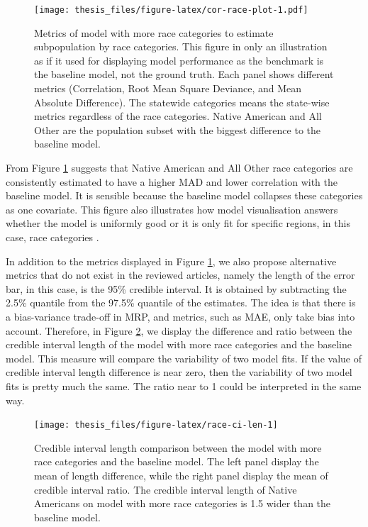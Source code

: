\documentclass{monashthesis}
\begin{document}
\begin{figure}
\centering
\texttt{[image: thesis\_files/figure-latex/cor-race-plot-1.pdf]}
\caption{\label{fig:cor-race-plot}Metrics of model with more race categories to estimate subpopulation by race categories. This figure in only an illustration as if it used for displaying model performance as the benchmark is the baseline model, not the ground truth. Each panel shows different metrics (Correlation, Root Mean Square Deviance, and Mean Absolute Difference). The statewide categories means the state-wise metrics regardless of the race categories. Native American and All Other are the population subset with the biggest difference to the baseline model.}
\end{figure}

From Figure \ref{fig:cor-race-plot} suggests that Native American and All Other race categories are consistently estimated to have a higher MAD and lower correlation with the baseline model. It is sensible because the baseline model collapses these categories as one covariate. This figure also illustrates how model visualisation answers whether the model is uniformly good or it is only fit for specific regions, in this case, race categories \autocite{WickhamHadley2015VsmR}.

In addition to the metrics displayed in Figure \ref{fig:cor-race-plot}, we also propose alternative metrics that do not exist in the reviewed articles, namely the length of the error bar, in this case, is the 95\% credible interval. It is obtained by subtracting the 2.5\% quantile from the 97.5\% quantile of the estimates. The idea is that there is a bias-variance trade-off in MRP, and metrics, such as MAE, only take bias into account. Therefore, in Figure \ref{fig:race-ci-len}, we display the difference and ratio between the credible interval length of the model with more race categories and the baseline model. This measure will compare the variability of two model fits. If the value of credible interval length difference is near zero, then the variability of two model fits is pretty much the same. The ratio near to 1 could be interpreted in the same way.

\begin{figure}
\texttt{[image: thesis\_files/figure-latex/race-ci-len-1]} \caption{Credible interval length comparison between the model with more race categories and the baseline model. The left panel display the mean of length difference, while the right panel display the mean of credible interval ratio. The credible interval length of Native Americans on model with more race categories is 1.5 wider than the baseline model.}\label{fig:race-ci-len}
\end{figure}
\end{document}
